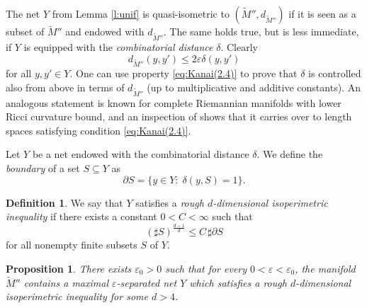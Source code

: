 \documentclass[10pt,letterpaper]{amsart}
\newtheorem{prop}[thm]{Proposition}
\theoremstyle{definition}
\newtheorem{definition}[thm]{Definition}
\numberwithin{thm}{subsection}
\numberwithin{equation}{section}
\begin{document}
The net $Y$ from Lemma \ref{l:unif} is quasi-isometric to $(\widetilde{M}'',d_{\widetilde{M}''})$ if it is seen as a subset of $\widetilde{M}''$ and endowed with $d_{\widetilde{M}''}$. The same holds true, but is less immediate, if $Y$ is equipped with the \emph{combinatorial distance} $\delta$. Clearly
\begin{displaymath}
d_{\widetilde{M}''}(y,y') \leq 2 \varepsilon \delta(y,y')
\end{displaymath}
for all $y,y'\in Y$.
One can use property \eqref{eq:Kanai(2.4)} to prove that $\delta$ is  controlled also from above in terms of $d_{\widetilde{M}''}$ (up to multiplicative and additive constants). An analogous statement is known for  complete Riemannian manifolds with lower Ricci curvature bound, and an inspection of \cite[Lemma 2.5]{MR792983} shows that it carries over to length spaces satisfying condition \eqref{eq:Kanai(2.4)}.

Let $Y$ be a net endowed with the combinatorial distance $\delta$. We define the \emph{boundary} of a set $S\subseteq Y$ as
\begin{displaymath}
\partial S = \{y\in Y:\; \delta(y,S)=1 \}.
\end{displaymath}

\begin{definition}
We say that $Y$ satisfies a \emph{rough $d$-dimensional isoperimetric inequality} if there exists a constant $0<C<\infty$ such that
\begin{displaymath}
(\sharp S)^{\frac{d-1}{d}}\leq C \,\sharp \partial S
\end{displaymath}
for all nonempty finite subsets $S$ of $Y$.
\end{definition}

\begin{prop}\label{p:roughIP}
There exists $\varepsilon_0>0$ such that for every $0<\varepsilon<\varepsilon_0$, the manifold $\widetilde{M}''$ contains a maximal $\varepsilon$-separated net $Y$ which satisfies a rough $d$-dimensional isoperimetric inequality for some $d>4$.
\end{prop}
\end{document}
